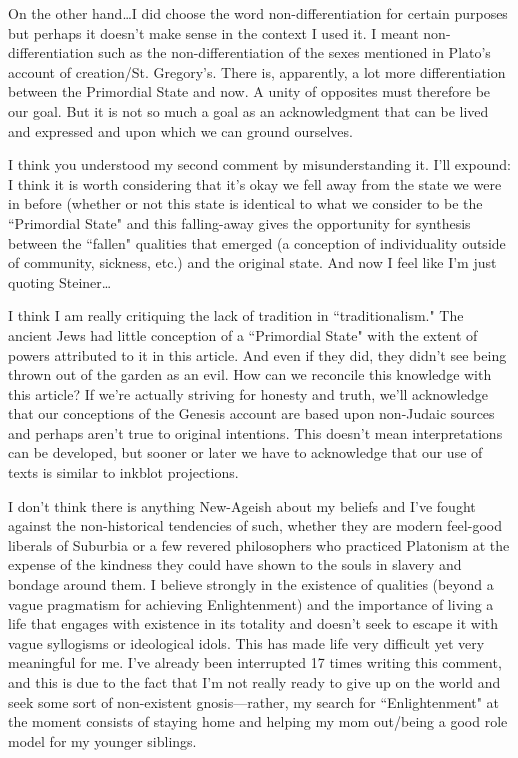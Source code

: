 \begin{footnotesize}
\begin{sffamily}
On the other hand…I did choose the word non-differentiation for certain purposes but perhaps it doesn't make sense in the context I used it. I meant non-differentiation such as the non-differentiation of the sexes mentioned in Plato's account of creation/St. Gregory's. There is, apparently, a lot more differentiation between the Primordial State and now. A unity of opposites must therefore be our goal. But it is not so much a goal as an acknowledgment that can be lived and expressed and upon which we can ground ourselves.

I think you understood my second comment by misunderstanding it. I'll expound: I think it is worth considering that it's okay we fell away from the state we were in before (whether or not this state is identical to what we consider to be the ``Primordial State" and this falling-away gives the opportunity for synthesis between the ``fallen" qualities that emerged (a conception of individuality outside of community, sickness, etc.) and the original state. And now I feel like I'm just quoting Steiner…

I think I am really critiquing the lack of tradition in ``traditionalism." The ancient Jews had little conception of a ``Primordial State" with the extent of powers attributed to it in this article. And even if they did, they didn't see being thrown out of the garden as an evil. How can we reconcile this knowledge with this article? If we're actually striving for honesty and truth, we'll acknowledge that our conceptions of the Genesis account are based upon non-Judaic sources and perhaps aren't true to original intentions. This doesn't mean interpretations can be developed, but sooner or later we have to acknowledge that our use of texts is similar to inkblot projections.

I don't think there is anything New-Ageish about my beliefs and I've fought against the non-historical tendencies of such, whether they are modern feel-good liberals of Suburbia or a few revered philosophers who practiced Platonism at the expense of the kindness they could have shown to the souls in slavery and bondage around them. I believe strongly in the existence of qualities (beyond a vague pragmatism for achieving Enlightenment) and the importance of living a life that engages with existence in its totality and doesn't seek to escape it with vague syllogisms or ideological idols. This has made life very difficult yet very meaningful for me. I've already been interrupted 17 times writing this comment, and this is due to the fact that I'm not really ready to give up on the world and seek some sort of non-existent gnosis—rather, my search for ``Enlightenment" at the moment consists of staying home and helping my mom out/being a good role model for my younger siblings.


\end{sffamily}
\end{footnotesize}
